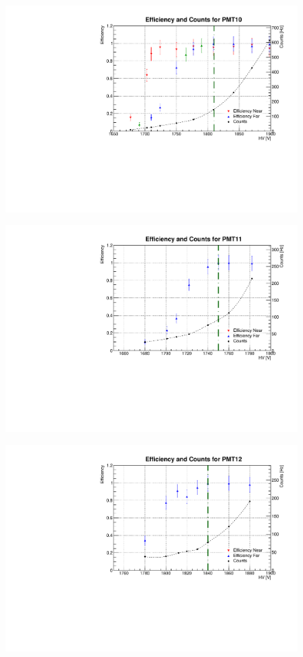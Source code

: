 \begin{figure}[h]
	\centerline{\includegraphics[scale=0.7]{img/eff10.pdf}}
\end{figure}
\begin{figure}[h]
	\centerline{\includegraphics[scale=0.7]{img/eff11.pdf}}
\end{figure}
\begin{figure}[h]
	\centerline{\includegraphics[scale=0.7]{img/eff12.pdf}}
\end{figure}
